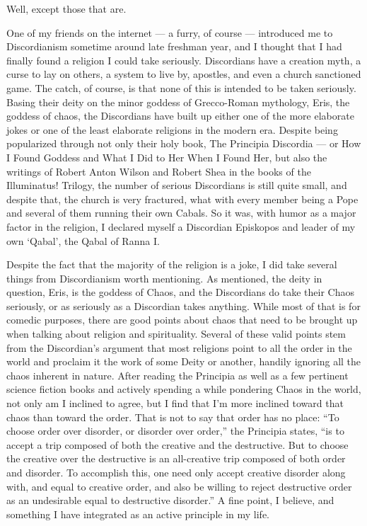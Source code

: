 \documentclass{book}
\begin{document}
Well, except those that are.

One of my friends on the internet --- a furry, of course --- introduced me to Discordianism sometime around late freshman year, and I thought that I had finally found a religion I could take seriously.  Discordians have a creation myth, a curse to lay on others, a system to live by, apostles, and even a church sanctioned game.  The catch, of course, is that none of this is intended to be taken seriously.  Basing their deity on the minor goddess of Grecco-Roman mythology, Eris, the goddess of chaos, the Discordians have built up either one of the more elaborate jokes or one of the least elaborate religions in the modern era.  Despite being popularized through not only their holy book, The Principia Discordia --- or How I Found Goddess and What I Did to Her When I Found Her, but also the writings of Robert Anton Wilson and Robert Shea in the books of the Illuminatus! Trilogy, the number of serious Discordians is still quite small, and despite that, the church is very fractured, what with every member being a Pope and several of them running their own Cabals.  So it was, with humor as a major factor in the religion, I declared myself a Discordian Episkopos and leader of my own `Qabal', the Qabal of Ranna I.

Despite the fact that the majority of the religion is a joke, I did take several things from Discordianism worth mentioning.  As mentioned, the deity in question, Eris, is the goddess of Chaos, and the Discordians do take their Chaos seriously, or as seriously as a Discordian takes anything.  While most of that is for comedic purposes, there are good points about chaos that need to be brought up when talking about religion and spirituality.  Several of these valid points stem from the Discordian's argument that most religions point to all the order in the world and proclaim it the work of some Deity or another, handily ignoring all the chaos inherent in nature.  After reading the Principia as well as a few pertinent science fiction books and actively spending a while pondering Chaos in the world, not only am I inclined to agree, but I find that I'm more inclined toward that chaos than toward the order.  That is not to say that order has no place: ``To choose order over disorder, or disorder over order,'' the Principia states, ``is to accept a trip composed of both the creative and the destructive.  But to choose the creative over the destructive is an all-creative trip composed of both order and disorder.  To accomplish this, one need only accept creative disorder along with, and equal to creative order, and also be willing to reject destructive order as an undesirable equal to destructive disorder.'' A fine point, I believe, and something I have integrated as an active principle in my life.
\end{document}
